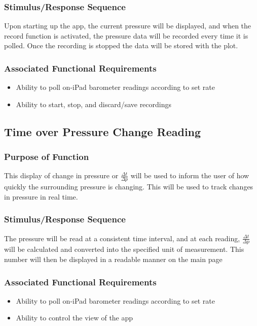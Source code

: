 \documentclass[onecolumn, draftclsnofoot,10pt, compsoc]{IEEEtran}
\begin{document}
\subsubsection{Stimulus/Response Sequence}
Upon starting up the app, the current pressure will be displayed, and when the record function is activated, the pressure data will be recorded every time it is polled.
Once the recording is stopped the data will be stored with the plot.
\subsubsection{Associated Functional Requirements}
\begin{itemize}
\item Ability to poll on-iPad barometer readings according to set rate
\item Ability to start, stop, and discard/save recordings
\end{itemize}

\subsection{Time over Pressure Change Reading}
\subsubsection{Purpose of Function}
This display of change in pressure or $\frac{\Delta t}{\Delta p}$ will be used to inform the user of how quickly the surrounding pressure is changing. This will be used to track changes in pressure in real time.
\subsubsection{Stimulus/Response Sequence}
The pressure will be read at a consistent time interval, and at each reading, $\frac{\Delta t}{\Delta p}$ will be calculated and converted into the specified unit of measurement. This number will then be displayed in a readable manner on the main page
\subsubsection{Associated Functional Requirements}
\begin{itemize}
\item Ability to poll on-iPad barometer readings according to set rate
\item Ability to control the view of the app
\end{itemize}
\end{document}
